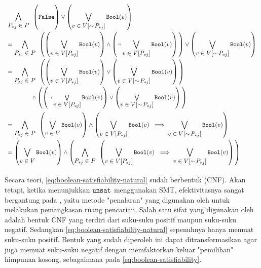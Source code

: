 \begin{equation}
	\begin{array}{l}
		\displaystyle \bigwedge \limits_{\displaystyle P_{*j} \in P} \enspace \combine{\left(}{\False}{\right)}{\vee}{\left(}{\bigvee \limits_{\displaystyle v \in V[\sim\!P_{*j}]} \boolmap(v)}{\right)} \\ [18pt]
		\displaystyle = \bigwedge \limits_{\displaystyle P_{*j} \in P} \enspace \combine{\left(}{\combine{\left(}{\bigvee \limits_{\displaystyle v \in V[P_{*j}]} \boolmap(v)}{\right)}{\wedge}{\left(}{\neg \bigvee \limits_{\displaystyle v \in V[P_{*j}]} \boolmap(v)}{\right)}}{\right)}{\vee}{\left(}{\bigvee \limits_{\displaystyle v \in V[\sim\!P_{*j}]} \boolmap(v)}{\right)} \\ [18pt]
		\displaystyle = \bigwedge \limits_{\displaystyle P_{*j} \in P} \enspace \combine{\left(}{\combine{\left(}{\bigvee \limits_{\displaystyle v \in V[P_{*j}]} \boolmap(v)}{\right)}{\vee}{\left(}{\bigvee \limits_{\displaystyle v \in V[\sim\!P_{*j}]} \boolmap(v)}{\right)}}{\right)}{\\[18pt]\qquad\qquad\wedge}{\left(}{\combine{\left(}{\neg \bigvee \limits_{\displaystyle v \in V[P_{*j}]} \boolmap(v)}{\right)}{\vee}{\left(}{\bigvee \limits_{\displaystyle v \in V[\sim\!P_{*j}]} \boolmap(v)}{\right)}}{\right)} \\ [18pt]
		\displaystyle = \bigwedge \limits_{\displaystyle P_{*j} \in P} \enspace \combine{\left(}{\bigvee \limits_{\displaystyle v \in V} \boolmap(v)}{\right)}{\wedge}{\left(}{\bigvee \limits_{\displaystyle v \in V[P_{*j}]} \boolmap(v)\ \implies \bigvee \limits_{\displaystyle v \in V[\sim\!P_{*j}]} \boolmap(v)}{\right)} \\ [18pt]
		\displaystyle = \combine{\left(}{\bigvee \limits_{\displaystyle v \in V} \boolmap(v)}{\right)}{\wedge}{\left(}{\bigwedge \limits_{\displaystyle P_{*j} \in P} \enspace \left( \bigvee \limits_{\displaystyle v \in V[P_{*j}]} \boolmap(v)\ \implies \bigvee \limits_{\displaystyle v \in V[\sim\!P_{*j}]} \boolmap(v) \right)}{\right)} \\ [18pt]
	\end{array}
	\label{eq:boolean-satisfiability}
\end{equation}

Secara teori,  \autoref{eq:boolean-satisfiability-natural} sudah berbentuk  (CNF). Akan tetapi, ketika menunjukkan \(\mathtt{unsat}\) menggunakan SMT, efektivitasnya sangat bergantung pada , yaitu metode "penalaran" yang digunakan oleh  untuk melakukan pemangkasan ruang pencarian. Salah satu sifat yang digunakan oleh  adalah bentuk CNF yang terdiri dari suku-suku positif maupun suku-suku negatif. Sedangkan \autoref{eq:boolean-satisfiability-natural} sepenuhnya hanya memuat suku-suku positif. Bentuk yang sudah diperoleh ini dapat ditransformasikan agar juga memuat suku-suku negatif dengan memfaktorkan keluar "pemilihan" himpunan kosong, sebagaimana pada \autoref{eq:boolean-satisfiability}.

